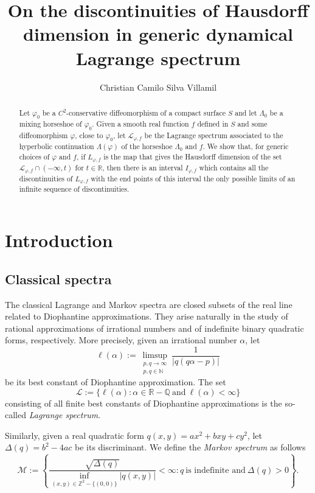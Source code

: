 \documentclass[12pt]{amsart}
\title[Discontinuities in generic dynamical Lagrange spectrum]
{On the discontinuities of Hausdorff dimension in generic dynamical Lagrange spectrum}
\author{Christian Camilo Silva Villamil}
\theoremstyle{plain} %
\theoremstyle{definition} %
\numberwithin{equation}{section}
\begin{document}
\begin{abstract}
Let $\varphi_0$ be a $C^2$-conservative diffeomorphism of a compact surface $S$ and let $\Lambda_0$ be a mixing horseshoe of $\varphi_0$. Given a smooth real function $f$ defined in $S$ and some diffeomorphism $\varphi$, close to $\varphi_0$, let $\mathcal{L}_{\varphi, f}$ be the Lagrange spectrum associated to the hyperbolic continuation $\Lambda(\varphi)$ of the horseshoe $\Lambda_0$ and $f$. We show that, for generic choices of $\varphi$ and $f$, if $L_{\varphi, f}$ is the map that gives the Hausdorff dimension of the set $\mathcal{L}_{\varphi, f}\cap (-\infty, t)$ for $t\in \mathbb{R}$, then there is an interval $I_{\varphi,f}$ which contains all the discontinuities of $L_{\varphi, f}$ with the end points of this interval the only possible limits of an infinite sequence of discontinuities.
 
\end{abstract}

\maketitle
\tableofcontents
\section{Introduction}\label{s.introduction}
\subsection{Classical spectra}\label{ss.classical-Markov-Lagrange} 
The classical Lagrange and Markov spectra are closed subsets of the real line related to Diophantine approximations. They arise naturally in the study of rational approximations of irrational numbers and of indefinite binary quadratic forms, respectively. More precisely, given an irrational number $\alpha$, let 
$$\ell(\alpha):=\limsup_{\substack{p, q\to\infty \\ p, q\in\mathbb{N}}}\frac{1}{|q(q\alpha-p)|}$$
be its best constant of Diophantine approximation. The set 
$$\mathcal{L}:=\{\ell(\alpha):\alpha\in\mathbb{R}-\mathbb{Q}\ \text{and}\ \ell(\alpha)<\infty\}$$ 
consisting of all finite best constants of Diophantine approximations is the so-called \emph{Lagrange spectrum}. 

Similarly, given a real quadratic form $q(x,y)=ax^2+bxy+cy^2$, let $\Delta(q)=b^2-4ac$ be its discriminant. We define the \emph{Markov spectrum} as follows
$$\mathcal{M}:=\left\{\frac{\sqrt{\Delta(q)}}{\inf\limits_{(x,y)\in\mathbb{Z}^2-\{(0,0)\}} |q(x,y)|} < \infty: q\ \text{is indefinite and}\ \Delta(q)>0\right\}.$$
 
\end{document}
